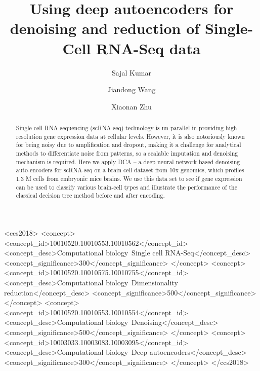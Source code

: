 \documentclass[sigconf]{acmart}
\begin{document}
\title{Using deep autoencoders for denoising and reduction of Single-Cell RNA-Seq data}

\author{Sajal Kumar}

\author{Jiandong Wang}

\author{Xiaonan Zhu}
\renewcommand{\shortauthors}{S. Kumar et al.}


\begin{abstract}
Single-cell RNA sequencing (scRNA-seq) technology is un-parallel in providing high resolution gene expression data at cellular levels. However, it is also notoriously known for being noisy due to amplification and dropout, making it a challenge for analytical methods to differentiate noise from patterns, so a scalable imputation and denoising mechanism is required. Here we apply DCA -- a deep neural network based denoising auto-encoders for scRNA-seq on a brain cell dataset from 10x genomics, which profiles 1.3 M cells from embryonic mice brains. We use this data set to see if gene expression can be used to classify various brain-cell types and illustrate the performance of the classical decision tree method before and after encoding.
\end{abstract}

%
%
\begin{CCSXML}
<ccs2018>
 <concept>
  <concept_id>10010520.10010553.10010562</concept_id>
  <concept_desc>Computational biology~Single cell RNA-Seq</concept_desc>
  <concept_significance>300</concept_significance>
 </concept>
 <concept>
  <concept_id>10010520.10010575.10010755</concept_id>
  <concept_desc>Computational biology~Dimensionality reduction</concept_desc>
  <concept_significance>500</concept_significance>
 </concept>
 <concept>
  <concept_id>10010520.10010553.10010554</concept_id>
  <concept_desc>Computational biology~Denoising</concept_desc>
  <concept_significance>500</concept_significance>
 </concept>
 <concept>
  <concept_id>10003033.10003083.10003095</concept_id>
  <concept_desc>Computational biology~Deep autoencoders</concept_desc>
  <concept_significance>300</concept_significance>
 </concept>
</ccs2018>
\end{CCSXML}
\end{document}
